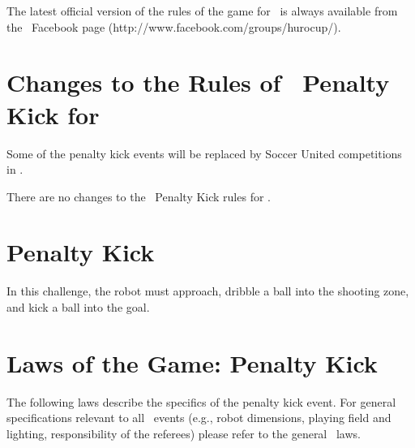 \documentclass[12pt]{hurocup}
\begin{document}
The latest official version of the rules of the game for \HuroCup\ is
always available from the \HuroCup\ Facebook page
(http://www.facebook.com/groups/hurocup/).

\section*{Changes to the Rules of \HuroCup\ Penalty Kick for \thisyear}

Some of the penalty kick events will be replaced by Soccer United
competitions in \thisyear.

There are no changes to the \HuroCup\ Penalty Kick rules for \thisyear.

\newpage

\section{Penalty Kick}
\label{sec:penalty-kick}

In this challenge, the robot must approach, dribble a ball into the
shooting zone, and kick a ball into the goal.

\section{Laws of the Game: Penalty Kick}
\label{sec:laws-penalty-kicks}

The following laws describe the specifics of the penalty kick event. For
general specifications relevant to all \HuroCup\ events (e.g., robot
dimensions, playing field and lighting, responsibility of the
referees) please refer to the general \HuroCup\ laws.

\label{pk-field}
\end{document}
